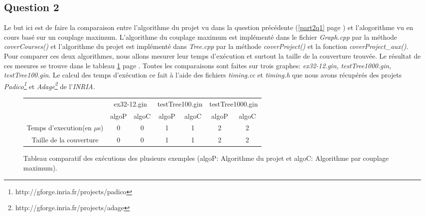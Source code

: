   \subsection{Question 2}
  Le but ici est de faire la comparaison entre l'algorithme du projet vu
  dans la question précédente (\ref{part2q1} page \pageref{part2q1}) et
  l'alogorithme vu en cours basé sur un couplage maximum.\newline
  \indent L'algorithme du couplage maximum est implémenté dans le fichier
  \emph{Graph.cpp} par la méthode \emph{coverCourses()} et l'algorithme
  du projet est implémenté dans \emph{Tree.cpp} par la méthode
  \emph{coverProject()} et la fonction \emph{coverProject\_aux()}.\newline
  \indent Pour comparer ces deux algorithmes, nous allons mesurer leur
  temps d'exécution et surtout la taille de la couverture trouvée. Le
  résultat de ces mesures se trouve dans le tableau \ref{tableau}
  page \pageref{tableau}. Toutes les comparaisons sont faites sur trois
  graphes: \emph{ex32-12.gin, testTree1000.gin, testTree100.gin}.\newline
  \indent Le calcul des temps d'exécution ce fait à l'aide des fichiers
  \emph{timing.cc} et \emph{timing.h} que nous avons récupérés des
  projets \emph{Padico\footnote{http://gforge.inria.fr/projects/padico}}
  et \emph{Adage\footnote{http://gforge.inria.fr/projects/adage}} de
  l'\emph{INRIA.}\newline

  \begin{figure}[!ht]
   \begin{center}
    \begin{tabular}{|c|c|c|c|c|c|c|}
     \cline{2-7}
     \multicolumn{1}{c|}{} & \multicolumn{2}{|c|}{ex32-12.gin}
     &\multicolumn{2}{|c|}{testTree100.gin} &
     \multicolumn{2}{|c|}{testTree1000.gin}\\ 
     \cline{2-7}
     \multicolumn{1}{c|}{} & algoP & algoC & algoP & algoC & algoP &
     algoC\\
     \hline
     Temps d'execution(en $\mu$s) & 0&0 &1 &1 &2& 2\\
     \hline
     Taille de la couverture & 0&0 & 1&1 & 2&2\\
     \hline
    \end{tabular}
    \caption{Tableau comparatif des exécutions des plusieurs
    exemples (algoP: Algorithme du projet et algoC: Algorithme par
    couplage maximum).\label{tableau}} 
   \end{center}
  \end{figure}  